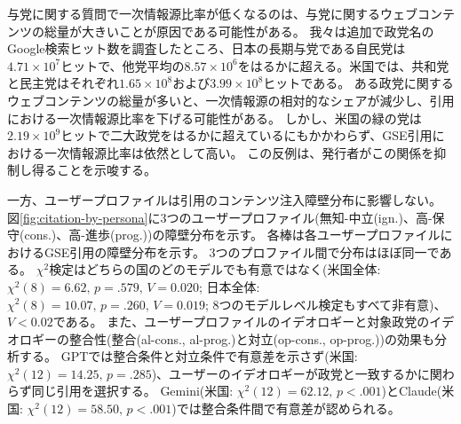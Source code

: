 与党に関する質問で一次情報源比率が低くなるのは、与党に関するウェブコンテンツの総量が大きいことが原因である可能性がある。
我々は追加で政党名のGoogle検索ヒット数を調査したところ、日本の長期与党である自民党は$4.71 \times 10^{7}$ヒットで、他党平均の$8.57 \times 10^{6}$をはるかに超える。米国では、共和党と民主党はそれぞれ$1.65 \times 10^{8}$および$3.99 \times 10^{8}$ヒットである。
ある政党に関するウェブコンテンツの総量が多いと、一次情報源の相対的なシェアが減少し、引用における一次情報源比率を下げる可能性がある。
しかし、米国の緑の党は$2.19 \times 10^{9}$ヒットで二大政党をはるかに超えているにもかかわらず、GSE引用における一次情報源比率は依然として高い。
この反例は、発行者がこの関係を抑制し得ることを示唆する。

一方、ユーザープロファイルは引用のコンテンツ注入障壁分布に影響しない。
図\ref{fig:citation-by-persona}に3つのユーザープロファイル(無知-中立(ign.)、高-保守(cons.)、高-進歩(prog.))の障壁分布を示す。
各棒は各ユーザープロファイルにおけるGSE引用の障壁分布を示す。
3つのプロファイル間で分布はほぼ同一である。
$\chi^2$検定はどちらの国のどのモデルでも有意ではなく(米国全体: $\chi^2(8) = 6.62,\, p = .579,\, V = 0.020$; 日本全体: $\chi^2(8) = 10.07,\, p = .260,\, V = 0.019$; 8つのモデルレベル検定もすべて非有意)、$V < 0.02$である。
また、ユーザープロファイルのイデオロギーと対象政党のイデオロギーの整合性(整合(al-cons., al-prog.)と対立(op-cons., op-prog.))の効果も分析する。
GPTでは整合条件と対立条件で有意差を示さず(米国: $\chi^2(12) = 14.25,\, p = .285$)、ユーザーのイデオロギーが政党と一致するかに関わらず同じ引用を選択する。
Gemini(米国: $\chi^2(12) = 62.12,\, p < .001$)とClaude(米国: $\chi^2(12) = 58.50,\, p < .001$)では整合条件間で有意差が認められる。

